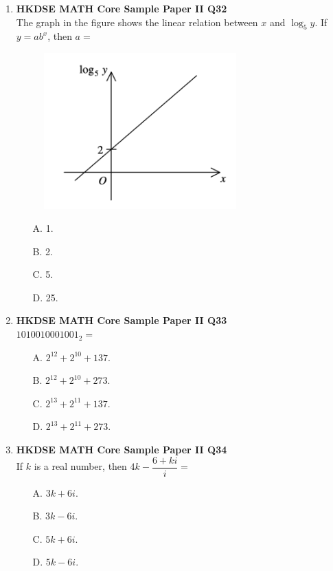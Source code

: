 \documentclass[12pt]{article}
\begin{document}
\begin{enumerate}
	\item \textbf{HKDSE MATH Core Sample Paper II Q32}\\
	The graph in the figure shows the linear relation between $x$ and $\log_5{y}$. If $y = ab^x$, then $a =$
	\begin{figure}[H]
		\centering
		\includegraphics[width = 0.7\textwidth]{SPFigure2.32.png}	
	\end{figure}
	\begin{enumerate}
		\item[A.] 1.
		\item[B.] 2.
		\item[C.] 5.
		\item[D.] 25.
	\end{enumerate}
	
	\item \textbf{HKDSE MATH Core Sample Paper II Q33}\\
	$1010010001001_2 = $
	\begin{enumerate}
		\item[A.] $2^{12} + 2^{10} + 137$.
		\item[B.] $2^{12} + 2^{10} + 273$.
		\item[C.] $2^{13} + 2^{11} + 137$.
		\item[D.] $2^{13} + 2^{11} + 273$.
	\end{enumerate}
	
	\item \textbf{HKDSE MATH Core Sample Paper II Q34}\\
	If $k$ is a real number, then $4k - \dfrac{6 + ki}{i} = $
	\begin{enumerate}
		\item[A.] $3k + 6i$.
		\item[B.] $3k - 6i$.
		\item[C.] $5k + 6i$.
		\item[D.] $5k - 6i$.
	\end{enumerate}
	

\end{enumerate}
\end{document}
